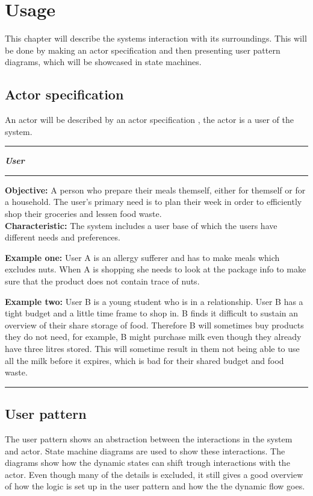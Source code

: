 \chapter{Usage}\label{Usage}
This chapter will describe the systems interaction with its surroundings. This will be done by making an actor specification and then presenting user pattern diagrams, which will be showcased in state machines.

\section{Actor specification}
\label{Actor_specification}
An actor will be described by an actor specification , the actor is a user of the system.

\hrule
\begin{tightcenter}
\textit{\textbf{User}}
\end{tightcenter}
\hrule
\textbf{Objective:} A person who prepare their meals themself, either for themself or for a household. The user's primary need is to plan their week in order to efficiently shop their groceries and lessen food waste.\\

\textbf{Characteristic:} The system includes a user base of which the users have different needs and preferences.

\textbf{Example one:} User A is an allergy sufferer and has to make meals which excludes nuts. When A is shopping she needs to look at the package info to make sure that the product does not contain trace of nuts.

\textbf{Example two:} User B is a young student who is in a relationship. User B has a tight budget and a little time frame to shop in. B finds it difficult to sustain an overview of their share storage of food. Therefore B will sometimes buy products they do not need, for example, B might purchase milk even though they already have three litres stored. This will sometime result in them not being able to use all the milk before it expires, which is bad for their shared budget and food waste.
\hrule



\section{User pattern}
The user pattern shows an abstraction between the interactions in the system and actor. State machine diagrams are used to show these interactions. The diagrams show how the dynamic states can shift trough interactions with the actor. Even though many of the details is excluded, it still gives a good overview of how the logic is set up in the user pattern and how the the dynamic flow goes. 

